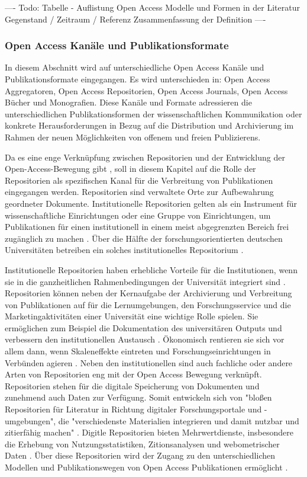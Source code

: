 ---- Todo: Tabelle - Auflistung Open Access  Modelle und Formen in der Literatur
Gegenstand / Zeitraum / Referenz
Zusammenfassung der Definition ----

\subsubsection{Open Access Kanäle und Publikationsformate}

In diesem Abschnitt wird auf unterschiedliche Open Access Kanäle und Publikationsformate eingegangen. Es wird unterschieden in: Open Access Aggregatoren, Open Access Repositorien, Open Access Journals, Open Access Bücher und Monografien. Diese Kanäle und Formate adressieren die unterschiedlichen Publikationsformen der wissenschaftlichen Kommunikation oder konkrete Herausforderungen in Bezug auf die Distribution und Archivierung im Rahmen der neuen Möglichkeiten von offenem und freien Publizierens.

Da es eine enge Verknüpfung zwischen Repositorien und der Entwicklung der Open-Access-Bewegung gibt \cite{adema_2013_political} \cite{offhaus_2012_institutionelle_repos}, soll in diesem Kapitel auf die Rolle der Repositorien als spezifischen Kanal für die Verbreitung von Publikationen eingegangen werden. Repositorien sind verwaltete Orte zur Aufbewahrung geordneter Dokumente. Institutionelle Repositorien gelten als ein Instrument für wissenschaftliche Einrichtungen oder eine Gruppe von Einrichtungen, um Publikationen für einen institutionell in einem meist abgegrenzten Bereich frei zugänglich zu machen \cite{dobratz_2007_open} \cite{Baggs_2006}. Über die Hälfte der forschungsorientierten deutschen Universitäten betreiben ein solches institutionelles Repositorium \cite{Schmidt_2009}.

Institutionelle Repositorien haben erhebliche Vorteile für die Institutionen, wenn sie in die ganzheitlichen Rahmenbedingungen der Universität integriert sind \cite{steele_2006}. Repositorien können neben der Kernaufgabe der Archivierung und Verbreitung von Publikationen auf für die Lernumgebungen, den Forschungsservice und die Marketingaktivitäten einer Universität eine wichtige Rolle spielen. Sie ermöglichen zum Beispiel die Dokumentation des universitären Outputs und verbessern den institutionellen Austausch \cite{steele_2006}. Ökonomisch rentieren sie sich vor allem dann, wenn Skaleneffekte eintreten und Forschungseinrichtungen in Verbünden agieren \cite{blythe_2005value}. Neben den institutionellen sind auch fachliche oder andere Arten von Repositorien eng mit der Open Access Bewegung verknüpft. Repositorien stehen für die digitale Speicherung von Dokumenten und zunehmend auch Daten zur Verfügung. Somit entwickeln sich von "bloßen Repositorien für Literatur in Richtung digitaler Forschungsportale und -umgebungen", die "verschiedenste Materialien integrieren und damit nutzbar und zitierfähig machen" \cite{Schmidt_2009}. Digitle Repositorien bieten Mehrwertdienste, insbesondere die Erhebung von Nutzungsstatistiken, Zitionsanalysen und webometrischer Daten \cite{jahn_2011_personliche} \cite{mayr_2005_webometrie}. Über diese Repositorien wird der Zugang zu den unterschiedlichen Modellen und Publikationswegen von Open Access Publikationen ermöglicht \cite{suber_2015}.

